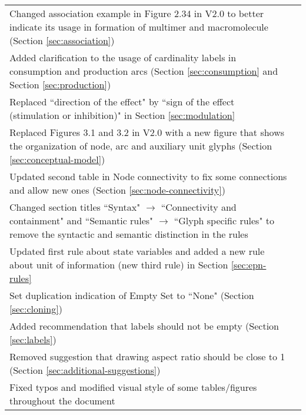 \begin{center}
\begin{supertabular}{|p{12cm}|c|}
& \\\hline Changed association example in Figure 2.34 in V2.0 to better indicate its usage in formation of multimer and macromolecule (Section \ref{sec:association}) 
& \\\hline Added clarification to the usage of cardinality labels in consumption and production arcs (Section \ref{sec:consumption} and Section \ref{sec:production})
& \\\hline Replaced ``direction of the effect" by ``sign of the effect (stimulation or inhibition)" in Section \ref{sec:modulation}
& \\\hline Replaced Figures 3.1 and 3.2 in V2.0 with a new figure that shows the organization of node, arc and auxiliary unit glyphs (Section \ref{sec:conceptual-model})
& \\\hline Updated second table in Node connectivity to fix some connections and allow new ones (Section \ref{sec:node-connectivity})
& \\\hline Changed section titles ``Syntax" $\rightarrow$ ``Connectivity and containment" and ``Semantic rules" $\rightarrow$ ``Glyph specific rules" to remove the syntactic and semantic distinction in the rules
& \\\hline Updated first rule about state variables and added a new rule about unit of information (new third rule) in Section \ref{sec:epn-rules}
& \\\hline Set duplication indication of Empty Set to ``None" (Section \ref{sec:cloning})
& \\\hline Added recommendation that labels should not be empty (Section \ref{sec:labels})
& \\\hline Removed suggestion that drawing aspect ratio should be close to 1 (Section \ref{sec:additional-suggestions})
& \\\hline Fixed typos and modified visual style of some tables/figures throughout the document
& \\\hline\end{supertabular}
\end{center}
